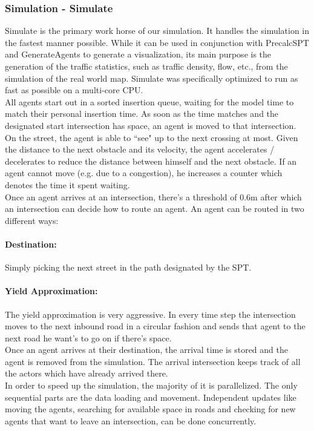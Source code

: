 \subsubsection{Simulation - Simulate}
Simulate is the primary work horse of our simulation. It handles the simulation in the fastest manner possible. While it can be used in conjunction with PrecalcSPT and GenerateAgents to generate a visualization, its main purpose is the generation of the traffic statistics, such as traffic density, flow, etc., from the simulation of the real world map. Simulate was specifically optimized to run as fast as possible on a multi-core CPU. \\
All agents start out in a sorted insertion queue, waiting for the model time to match their personal insertion time. As soon as the time matches and the designated start intersection has space, an agent is moved to that intersection. On the street, the agent is able to ``see" up to the next crossing at most. Given the distance to the next obstacle and its velocity, the agent accelerates / decelerates to reduce the distance between himself and the next obstacle. If an agent cannot move (e.g. due to a congestion), he increases a counter which denotes the time it spent waiting. \\
Once an agent arrives at an intersection, there's a threshold of 0.6m after which an intersection can decide how to route an agent. An agent can be routed in two different ways: 

\paragraph*{Destination:}
Simply picking the next street in the path designated by the SPT.

\paragraph*{Yield Approximation:}
The yield approximation is very aggressive. In every time step the intersection moves to the next inbound road in a circular fashion and sends that agent to the next road he want's to go on if there's space.\\
\newline
Once an agent arrives at their destination, the arrival time is stored and the agent is removed from the simulation. The arrival intersection keeps track of all the actors which have already arrived there. \\
In order to speed up the simulation, the majority of it is parallelized. The only sequential parts are the data loading and movement. Independent updates like moving the agents, searching for available space in roads and checking for new agents that want to leave an intersection, can be done concurrently. 

